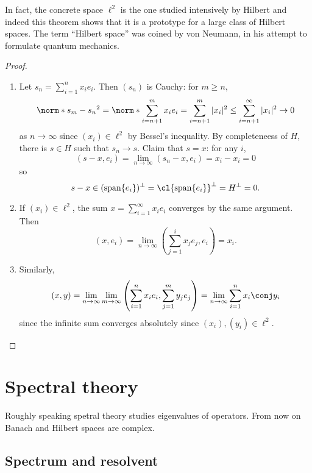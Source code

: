 \documentclass[a4paper]{article}
\DeclareMathOperator{\spans}{span} %
\begin{document}

In fact, the concrete space \(\ell^2\) is the one studied intensively by Hilbert and indeed this theorem shows that it is a prototype for a large class of Hilbert spaces. The term ``Hilbert space'' was coined by von Neumann, in his attempt to formulate quantum mechanics.

\begin{proof}\leavevmode
  \begin{enumerate}
  \item Let \(s_n = \sum_{i = 1}^n x_ie_i\). Then \((s_n)\) is Cauchy: for \(m \geq n\),
    \[
      \norm*{s_m - s_n}^2
      = \norm*{\sum_{i = n + 1}^m x_ie_i}
      = \sum_{i = n + 1}^m |x_i|^2
      \leq \sum_{i = n + 1}^\infty |x_i|^2
      \to 0
    \]
    as \(n \to \infty\) since \((x_i) \in \ell^2\) by Bessel's inequality. By completeneess of \(H\), there is \(s \in H\) such that \(s_n \to s\). Claim that \(s = x\): for any \(i\),
    \[
      (s - x, e_i)
      = \lim_{n \to \infty} (s_n - x, e_i)
      = x_i - x_i
      = 0
    \]
    so
    \[
      s - x \in (\spans \{e_i\})^\perp
      = \cl{\spans \{e_i\}}^\perp
      = H^\perp
      = 0.
    \]
  \item If \((x_i) \in \ell^2\), the sum \(x = \sum_{i = 1}^\infty x_ie_i\) converges by the same argument. Then
    \[
      (x, e_i) = \lim_{n \to \infty} \left( \sum_{j = 1}^i x_je_j, e_i \right) = x_i.
    \]
  \item Similarly,
    \[
      (x, y) = \lim_{n \to \infty} \lim_{m \to \infty} \left( \sum_{i = 1}^n x_ie_i, \sum_{j = 1}^m y_j e_j \right) = \lim_{n \to \infty} \sum_{i = 1}^n x_i \conj y_i
    \]
    since the infinite sum converges absolutely since \((x_i), (y_i) \in \ell^2\).
  \end{enumerate}
\end{proof}

\section{Spectral theory}

Roughly speaking spetral theory studies eigenvalues of operators. From now on Banach and Hilbert spaces are complex.

\subsection{Spectrum and resolvent}
\end{document}
